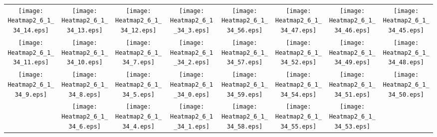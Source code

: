\documentclass{standalone}
\begin{document}
\begin{tabular}{ *8{c} }
\texttt{[image: Heatmap2\_6\_1\_34\_14.eps]} & \texttt{[image: Heatmap2\_6\_1\_34\_13.eps]} & \texttt{[image: Heatmap2\_6\_1\_34\_12.eps]} & \texttt{[image: Heatmap2\_6\_1\_34\_3.eps]} & \texttt{[image: Heatmap2\_6\_1\_34\_56.eps]} & \texttt{[image: Heatmap2\_6\_1\_34\_47.eps]} & \texttt{[image: Heatmap2\_6\_1\_34\_46.eps]} & \texttt{[image: Heatmap2\_6\_1\_34\_45.eps]} \\
\texttt{[image: Heatmap2\_6\_1\_34\_11.eps]} & \texttt{[image: Heatmap2\_6\_1\_34\_10.eps]} & \texttt{[image: Heatmap2\_6\_1\_34\_7.eps]} & \texttt{[image: Heatmap2\_6\_1\_34\_2.eps]} & \texttt{[image: Heatmap2\_6\_1\_34\_57.eps]} & \texttt{[image: Heatmap2\_6\_1\_34\_52.eps]} & \texttt{[image: Heatmap2\_6\_1\_34\_49.eps]} & \texttt{[image: Heatmap2\_6\_1\_34\_48.eps]} \\
\texttt{[image: Heatmap2\_6\_1\_34\_9.eps]} & \texttt{[image: Heatmap2\_6\_1\_34\_8.eps]} & \texttt{[image: Heatmap2\_6\_1\_34\_5.eps]} & \texttt{[image: Heatmap2\_6\_1\_34\_0.eps]} & \texttt{[image: Heatmap2\_6\_1\_34\_59.eps]} & \texttt{[image: Heatmap2\_6\_1\_34\_54.eps]} & \texttt{[image: Heatmap2\_6\_1\_34\_51.eps]} & \texttt{[image: Heatmap2\_6\_1\_34\_50.eps]} \\
 & \texttt{[image: Heatmap2\_6\_1\_34\_6.eps]} & \texttt{[image: Heatmap2\_6\_1\_34\_4.eps]} & \texttt{[image: Heatmap2\_6\_1\_34\_1.eps]} & \texttt{[image: Heatmap2\_6\_1\_34\_58.eps]} & \texttt{[image: Heatmap2\_6\_1\_34\_55.eps]} & \texttt{[image: Heatmap2\_6\_1\_34\_53.eps]} &  
\end{tabular}
\end{document}
